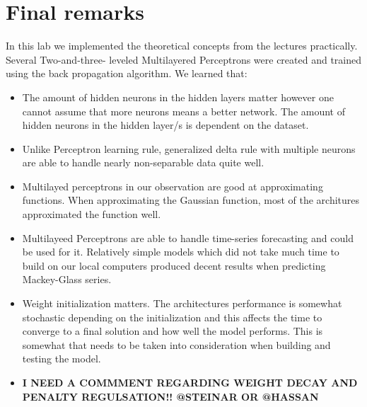 \documentclass[a4paper]{article}
\begin{document}
\section{Final remarks }
In this lab we implemented the theoretical concepts from the lectures practically. Several Two-and-three- leveled Multilayered Perceptrons were created and trained using the back propagation algorithm. We learned that:
\begin{itemize}
    \item The amount of hidden neurons in the hidden layers matter however one cannot assume that more neurons means a better network. The amount of hidden neurons in the hidden layer/s is dependent on the dataset.
    \item Unlike Perceptron learning rule, generalized delta rule with multiple neurons are able to handle nearly non-separable data quite well. 
    \item Multilayed perceptrons in our observation are good at approximating functions. When approximating the Gaussian function, most of the architures approximated the function well.
    \item Multilayeed Perceptrons are able to handle time-series forecasting and could be used for it. Relatively simple models which did not take much time to build on our local computers produced decent results when predicting Mackey-Glass series.
    \item Weight initialization matters. The architectures performance is somewhat stochastic depending on the initialization and this affects the time to converge to a final solution and how well the model performs. This is somewhat that needs to be taken into consideration when building and testing the model.
    \item \textbf{I NEED A COMMMENT REGARDING WEIGHT DECAY AND PENALTY REGULSATION!! @STEINAR OR @HASSAN}
\end{itemize}
\end{document}
